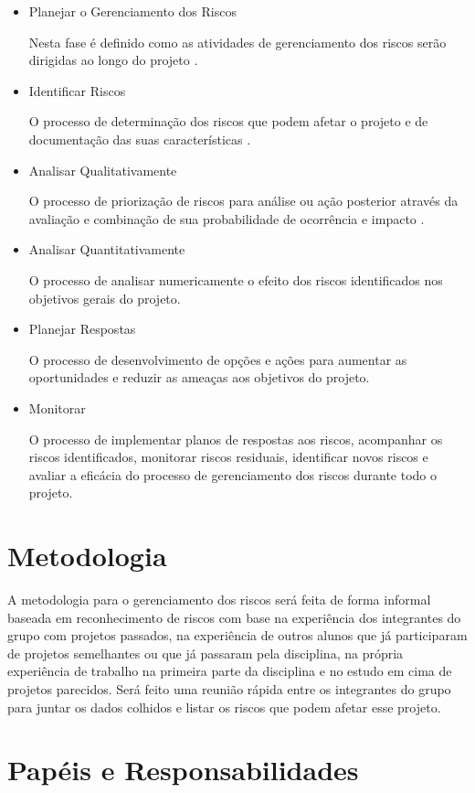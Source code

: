 \begin{itemize}
	\item Planejar o Gerenciamento dos Riscos
		\par Nesta fase é definido como as atividades de gerenciamento dos riscos serão dirigidas ao longo do projeto \cite{pmbok2013guia}.
	\item Identificar Riscos
		\par O processo de determinação dos riscos que podem afetar o projeto e de documentação das suas características \cite{pmbok2013guia}.
	\item Analisar Qualitativamente
		\par O processo de priorização de riscos para análise ou ação posterior através da avaliação e combinação de sua probabilidade de ocorrência e impacto \cite{pmbok2013guia}.
	\item Analisar Quantitativamente
		\par O processo de analisar numericamente o efeito dos riscos identificados nos objetivos gerais do projeto.
	\item Planejar Respostas
		\par O processo de desenvolvimento de opções e ações para aumentar as oportunidades e reduzir as ameaças aos objetivos do projeto.
	\item Monitorar
		\par O processo de implementar planos de respostas aos riscos, acompanhar os riscos identificados, monitorar riscos residuais, identificar novos riscos e avaliar a eficácia do processo de gerenciamento dos riscos durante todo o projeto.
\end{itemize}

\section{Metodologia}

A metodologia para o gerenciamento dos riscos será feita de forma informal baseada em reconhecimento de riscos com base na experiência dos integrantes do grupo com projetos passados, na experiência de outros alunos que já participaram de projetos semelhantes ou que já passaram pela disciplina, na própria experiência de trabalho na primeira parte da disciplina e no estudo em cima de projetos parecidos. Será feito uma reunião rápida entre os integrantes do grupo para juntar os dados colhidos e listar os riscos que podem afetar esse projeto.

\section{Papéis e Responsabilidades}

